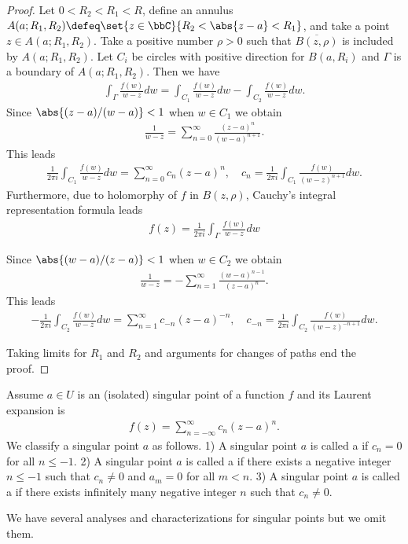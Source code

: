 \documentclass[openany, a4paper, oneside]{jsbook}
\begin{document}
\begin{proof}
Let $0 < R_2 < R_1 < R$, define an annulus $A (a; R_1, R_2) \defeq \set{z \in \bbC}{R_2 < \abs{z - a} < R_1}$,
and take a point $z \in A (a; R_1, R_2)$.
Take a positive number $\rho > 0$ such that $\overline{B (z, \rho)}$ is included by $A (a; R_1, R_2)$.
Let $C_i$ be circles with positive direction for $B (a, R_i)$ and $\Gamma$ is a boundary of $A (a; R_1, R_2)$.
Then we have
\begin{align}
 \int_{\Gamma} \frac{f (w)}{w - z} dw
 =
 \int_{C_1} \frac{f (w)}{w - z} dw - \int_{C_2} \frac{f (w)}{w - z} dw.
\end{align}
Since $\abs{(z - a) / (w - a)} < 1$ when $w \in C_1$ we obtain
\begin{align}
 \frac{1}{w - z} = \sum_{n=0}^{\infty} \frac{(z - a)^n}{(w - a)^{n+1}}.
\end{align}
This leads
\begin{align}
 \frac{1}{2 \pi i} \int_{C_1} \frac{f (w)}{w - z} dw
 =
 \sum_{n=0}^{\infty} c_n (z - a)^n, \quad
 c_n
 =
 \frac{1}{2 \pi i} \int_{C_1} \frac{f (w)}{(w - z)^{n+1}} dw.
\end{align}
Furthermore, due to holomorphy of $f$ in $B (z, \rho)$, Cauchy's integral representation formula leads
\begin{align}
 f (z)
 =
 \frac{1}{2 \pi i} \int_{\Gamma} \frac{f (w)}{w - z} dw
\end{align}

Since $\abs{(w - a) / (z - a)} < 1$ when $w \in C_2$ we obtain
\begin{align}
 \frac{1}{w - z} = - \sum_{n=1}^{\infty} \frac{(w - a)^{n-1}}{(z - a)^{n}}.
\end{align}
This leads
\begin{align}
 -\frac{1}{2 \pi i} \int_{C_2} \frac{f (w)}{w - z} dw
 =
 \sum_{n=1}^{\infty} c_{-n} (z - a)^{-n}, \quad
 c_{-n}
 =
 \frac{1}{2 \pi i} \int_{C_2} \frac{f (w)}{(w - z)^{-n+1}} dw.
\end{align}

Taking limits for $R_1$ and $R_2$ and arguments for changes of paths end the proof.
\end{proof}

\begin{defn}
 Assume $a \in U$ is an (isolated) singular point of a function $f$ and its Laurent expansion is
 \begin{align}
  f (z)
  =
  \sum_{n=-\infty}^{\infty} c_n (z-a)^n.
 \end{align}
 We classify a singular point $a$ as follows.
 1) A singular point $a$ is called a  if $c_{n} = 0$ for all $n \leq -1$.
 2) A singular point $a$ is called a  if there exists a negative integer $n \leq -1$ such that
    $c_{n} \neq 0$ and $a_m = 0$ for all $m < n$.
 3) A singular point $a$ is called a  if there exists infinitely many negative integer $n$ such that $c_n \neq 0$.
\end{defn}
We have several analyses and characterizations for singular points but we omit them.
\end{document}
